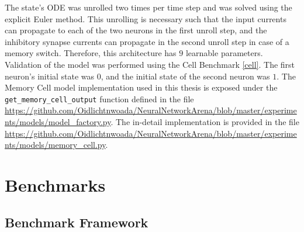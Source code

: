 \documentclass[draft,final]{vutinfth} %
\begin{document}
    The state's ODE was unrolled two times per time step and was solved using the explicit Euler method.
    This unrolling is necessary such that the input currents can propagate to each of the two neurons in the first unroll step, and the inhibitory synapse currents can propagate in the second unroll step in case of a memory switch.
    Therefore, this architecture has $9$ learnable parameters. 
    Validation of the model was performed using the Cell Benchmark \ref{cell}.
    The first neuron's initial state was $0$, and the initial state of the second neuron was $1$.
    The Memory Cell model implementation used in this thesis is exposed under the \texttt{get\_memory\_cell\_output} function defined in the file \url{https://github.com/Oidlichtnwoada/NeuralNetworkArena/blob/master/experiments/models/model_factory.py}.
    The in-detail implementation is provided in the file \url{https://github.com/Oidlichtnwoada/NeuralNetworkArena/blob/master/experiments/models/memory_cell.py}.

    \chapter{Benchmarks}

    \section{Benchmark Framework}
\end{document}
